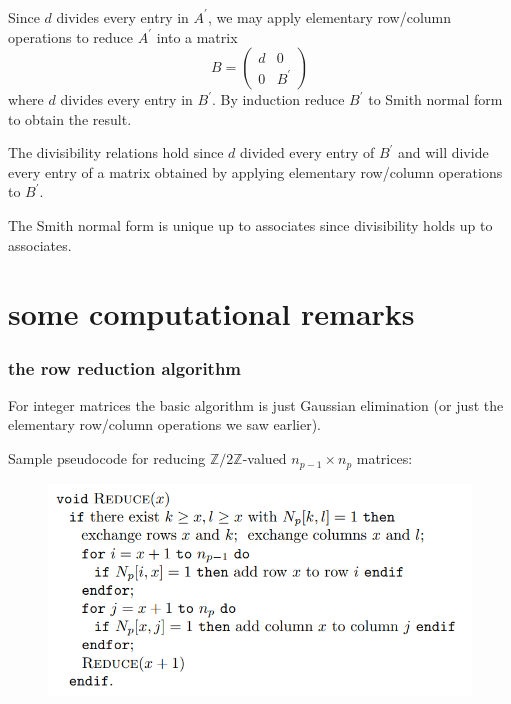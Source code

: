 \documentclass{beamer}
\begin{document}
\begin{frame}
  \frametitle{}

  Since $d$ divides every entry in $A^{\prime}$, we may apply elementary row/column operations to reduce $A^{\prime}$ into a matrix \[B = \left(\begin{array}{c|c}
    d & 0\\\hline 0 & B^{\prime}
  \end{array}\right)\] where $d$ divides every entry in $B^{\prime}$. By induction reduce $B^{\prime}$ to Smith normal form to obtain the result.

  The divisibility relations hold since $d$ divided every entry of $B^{\prime}$ and will divide every entry of a matrix obtained by applying elementary row/column operations to $B^{\prime}$.

  The Smith normal form is unique up to associates since divisibility holds up to associates.

\end{frame}

\section{some computational remarks}

\begin{frame}
  \frametitle{the row reduction algorithm}

  For integer matrices the basic algorithm is just Gaussian elimination (or just the elementary row/column operations we saw earlier).

  Sample pseudocode for reducing $\mathbb{Z}/2\mathbb{Z}$-valued $n_{p-1}\times n_p$ matrices: \begin{figure}[h]
    \centering
    \includegraphics[scale=0.70]{z2algo.PNG}
  \end{figure}

\end{frame}
\end{document}
